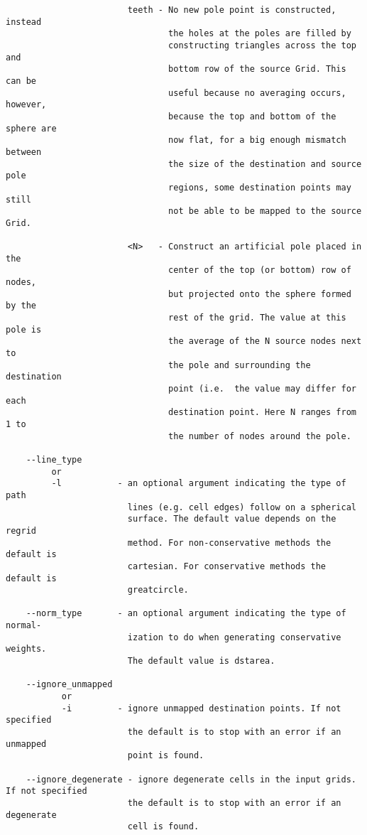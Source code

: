 \begin{verbatim}
                        teeth - No new pole point is constructed, instead
                                the holes at the poles are filled by
                                constructing triangles across the top and
                                bottom row of the source Grid. This can be
                                useful because no averaging occurs, however,
                                because the top and bottom of the sphere are
                                now flat, for a big enough mismatch between
                                the size of the destination and source pole
                                regions, some destination points may still
                                not be able to be mapped to the source Grid.

                        <N>   - Construct an artificial pole placed in the
                                center of the top (or bottom) row of nodes,
                                but projected onto the sphere formed by the
                                rest of the grid. The value at this pole is
                                the average of the N source nodes next to
                                the pole and surrounding the destination
                                point (i.e.  the value may differ for each
                                destination point. Here N ranges from 1 to
                                the number of nodes around the pole.

    --line_type 
         or
         -l           - an optional argument indicating the type of path
                        lines (e.g. cell edges) follow on a spherical
                        surface. The default value depends on the regrid
                        method. For non-conservative methods the default is
                        cartesian. For conservative methods the default is
                        greatcircle. 

    --norm_type       - an optional argument indicating the type of normal-
                        ization to do when generating conservative weights. 
                        The default value is dstarea.

    --ignore_unmapped
           or
           -i         - ignore unmapped destination points. If not specified
                        the default is to stop with an error if an unmapped
                        point is found.

    --ignore_degenerate - ignore degenerate cells in the input grids. If not specified
                        the default is to stop with an error if an degenerate
                        cell is found.


\end{verbatim}
